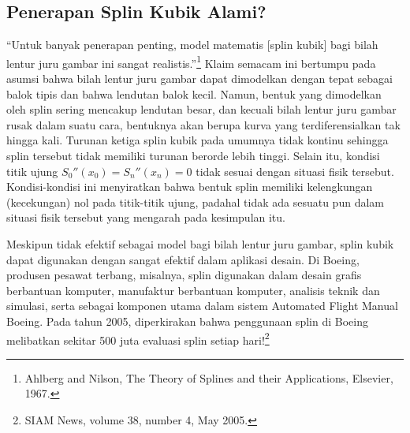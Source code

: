 \subsection{Penerapan Splin Kubik Alami?}

``Untuk banyak penerapan penting, model matematis {[}splin kubik{]}
bagi bilah lentur juru gambar ini sangat realistis.''\footnote{Ahlberg and Nilson, The Theory of Splines and their Applications,
Elsevier, 1967.} Klaim semacam ini bertumpu pada asumsi bahwa bilah lentur juru gambar
dapat dimodelkan dengan tepat sebagai balok tipis dan bahwa lendutan
balok kecil. Namun, bentuk yang dimodelkan oleh splin sering mencakup
lendutan besar, dan kecuali bilah lentur juru gambar rusak dalam suatu
cara, bentuknya akan berupa kurva yang terdiferensialkan tak hingga
kali. Turunan ketiga splin kubik pada umumnya tidak kontinu sehingga
splin tersebut tidak memiliki turunan berorde lebih tinggi. Selain
itu, kondisi titik ujung $S_{0}''(x_{0})=S_{n}''(x_{n})=0$ tidak
sesuai dengan situasi fisik tersebut. Kondisi-kondisi ini menyiratkan
bahwa bentuk splin memiliki kelengkungan (kecekungan) nol pada titik-titik
ujung, padahal tidak ada sesuatu pun dalam situasi fisik tersebut
yang mengarah pada kesimpulan itu.

Meskipun tidak efektif sebagai model bagi bilah lentur juru gambar,
splin kubik dapat digunakan dengan sangat efektif dalam aplikasi desain.
Di Boeing, produsen pesawat terbang, misalnya, splin digunakan dalam
desain grafis berbantuan komputer, manufaktur berbantuan komputer,
analisis teknik dan simulasi, serta sebagai komponen utama dalam sistem
Automated Flight Manual Boeing. Pada tahun 2005, diperkirakan bahwa
penggunaan splin di Boeing melibatkan sekitar 500 juta evaluasi splin
setiap hari!\footnote{SIAM News, volume 38, number 4, May 2005.}

\noindent\startexercises 


